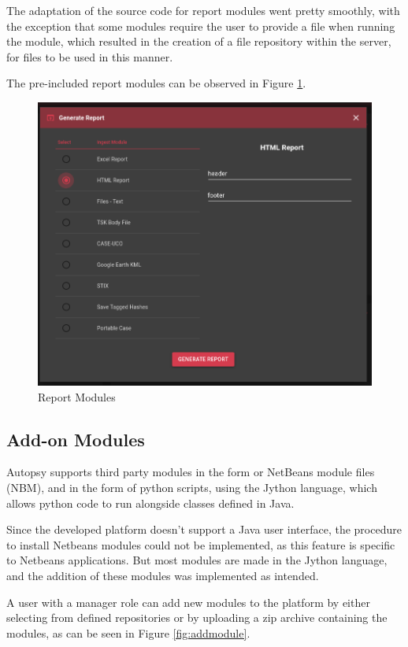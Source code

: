 The adaptation of the source code for report modules went pretty smoothly, with the exception that some modules require the user to provide a file when running the module, which resulted in the creation of a file repository within the server, for files to be used in this manner.

The pre-included report modules can be observed in Figure \ref{fig:reports}.

\begin{figure}[ht]
 \centering
 \includegraphics[width=0.65\linewidth]{imgs/reports.png}
 \caption{Report Modules}
 \label{fig:reports}
\end{figure}

\subsection{Add-on Modules}

Autopsy supports third party modules in the form or NetBeans \cite{netbeans} module files (NBM), and in the form of python scripts, using the Jython language, which allows python code to run alongside classes defined in Java.

Since the developed platform doesn't support a Java user interface, the procedure to install Netbeans modules could not be implemented, as this feature is specific to Netbeans applications. 
But most modules are made in the Jython language, and the addition of these modules was implemented as intended.

A user with a manager role can add new modules to the platform by either selecting from defined repositories or by uploading a zip archive containing the modules, as can be seen in Figure \ref{fig:addmodule}.

